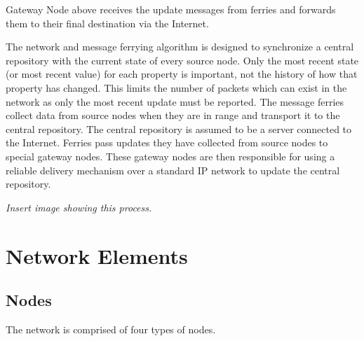Gateway Node above receives the update messages from ferries and forwards them to their final destination via the Internet. 


The network and message ferrying algorithm is designed to synchronize a central repository with the current state of every source node.
Only the most recent state (or most recent value) for each property is important, not the history of how that property has changed.
This limits the number of packets which can exist in the network as only the most recent update must be reported.
The message ferries collect data from source nodes when they are in range and transport it to the central repository.
The central repository is assumed to be a server connected to the Internet.
Ferries pass updates they have collected from source nodes to special gateway nodes.
These gateway nodes are then responsible for using a reliable delivery mechanism over a standard IP network to update the central repository.

\emph{Insert image showing this process.}

\section{Network Elements}



\subsection{Nodes}

The network is comprised of four types of nodes.

